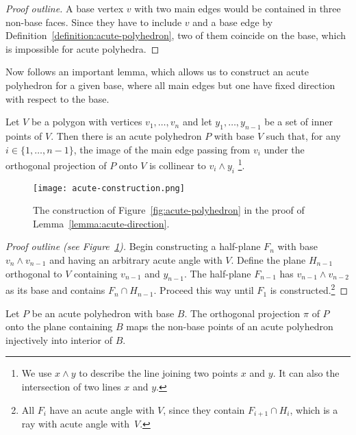 \begin{proof}[Proof outline]
  A base vertex $v$ with two main edges would be contained in three non-base faces. Since they have to include $v$ and a base edge by Definition~\ref{definition:acute-polyhedron}, two of them coincide on the base, which is impossible for acute polyhedra.
\end{proof}

Now follows an important lemma, which allows us to construct an acute polyhedron for a given base, where all main edges but one have fixed direction with respect to the base.

\begin{lemma}\label{lemma:acute-direction}
  Let $V$ be a polygon with vertices $v_1,\dots,v_n$ and let $y_1,\dots,y_{n-1}$ be a set of inner points of $V$.
  Then there is an acute polyhedron $P$ with base $V$ such that, for any $i \in \{1,\dots,n-1\}$, the image of the main edge passing from $v_i$ under the orthogonal projection of $P$ onto $V$ is collinear to $v_i \wedge y_i$ \footnote{We use $x \wedge y$ to describe the line joining two points $x$ and $y$. It can also the intersection of two lines $x$ and $y$.}.
\end{lemma}

\begin{figure}[ht]
  \centering
  \texttt{[image: acute-construction.png]}
  \caption{The construction of Figure~\ref{fig:acute-polyhedron} in the proof of Lemma~\ref{lemma:acute-direction}.}
  \label{fig:acute-construction}
\end{figure}

\begin{proof}[Proof outline (see Figure~\ref{fig:acute-construction})]
  Begin constructing a half-plane $F_n$ with base $v_n \wedge v_{n-1}$ and having an arbitrary acute angle with $V$. Define the plane $H_{n-1}$ orthogonal to $V$ containing $v_{n-1}$ and $y_{n-1}$. The half-plane $F_{n-1}$ has $v_{n-1} \wedge v_{n-2}$ as its base and contains $F_n \cap H_{n-1}$. Proceed this way until $F_1$ is constructed.\footnote{All $F_i$ have an acute angle with $V$, since they contain $F_{i+1} \cap H_i$, which is a ray with acute angle with~$V$.}
\end{proof}

\begin{observation}\label{observation:acute-projection}
  Let $P$ be an acute polyhedron with base $B$.
  The orthogonal projection $\pi$ of $P$ onto the plane containing $B$ maps the non-base points of an acute polyhedron injectively into interior of $B$.
\end{observation}

